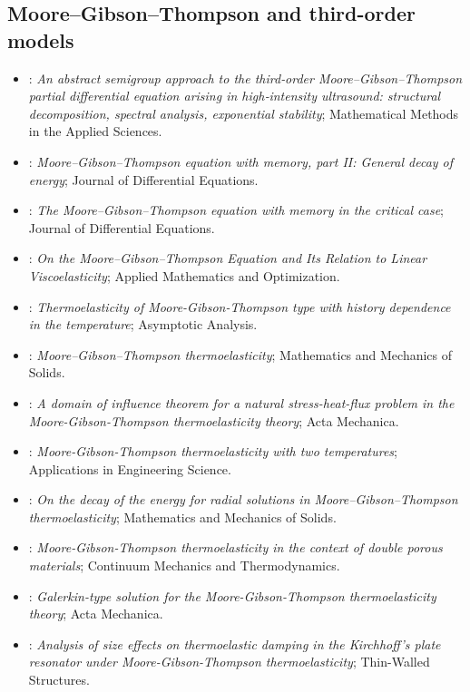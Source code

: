 \subsection{Moore--Gibson--Thompson and third-order models}
\begin{itemize}\itemsep0pt\small
\item \citet{MarchandMcDevittTriggiani2012}: \emph{An abstract semigroup approach to the third‐order Moore–Gibson–Thompson partial differential equation arising in high‐intensity ultrasound: structural decomposition, spectral analysis, exponential stability}; Mathematical Methods in the Applied Sciences.
\item \citet{LasieckaWang2015MGT}: \emph{Moore–Gibson–Thompson equation with memory, part II: General decay of energy}; Journal of Differential Equations.
\item \citet{DellOroLasieckaPata2016MGT}: \emph{The Moore–Gibson–Thompson equation with memory in the critical case}; Journal of Differential Equations.
\item \citet{DellOroPata2016Viscoelasticity}: \emph{On the Moore--Gibson--Thompson Equation and Its Relation to Linear Viscoelasticity}; Applied Mathematics and Optimization.
\item \citet{Conti2019}: \emph{Thermoelasticity of Moore-Gibson-Thompson type with history dependence in the temperature}; Asymptotic Analysis.
\item \citet{Quintanilla2019}: \emph{Moore–Gibson–Thompson thermoelasticity}; Mathematics and Mechanics of Solids.
\item \citet{Jangid2020}: \emph{A domain of influence theorem for a natural stress-heat-flux problem in the Moore-Gibson-Thompson thermoelasticity theory}; Acta Mechanica.
\item \citet{Quintanilla2020}: \emph{Moore-Gibson-Thompson thermoelasticity with two temperatures}; Applications in Engineering Science.
\item \citet{Bazarra2021MGTradial}: \emph{On the decay of the energy for radial solutions in Moore–Gibson–Thompson thermoelasticity}; Mathematics and Mechanics of Solids.
\item \citet{Florea2021}: \emph{Moore-Gibson-Thompson thermoelasticity in the context of double porous materials}; Continuum Mechanics and Thermodynamics.
\item \citet{Singh2021}: \emph{Galerkin-type solution for the Moore-Gibson-Thompson thermoelasticity theory}; Acta Mechanica.
\item \citet{Singh2022}: \emph{Analysis of size effects on thermoelastic damping in the Kirchhoff's plate resonator under Moore-Gibson-Thompson thermoelasticity}; Thin-Walled Structures.

\end{itemize}
